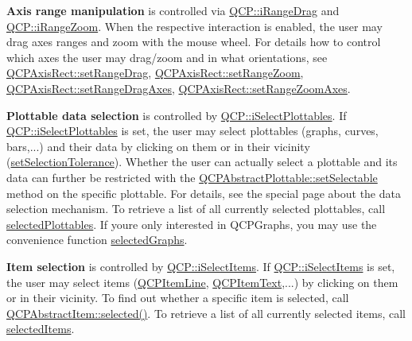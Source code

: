 {\bfseries{Axis range manipulation}} is controlled via \mbox{\hyperlink{namespace_q_c_p_a2ad6bb6281c7c2d593d4277b44c2b037a2c4432b9aceafb94000be8d1b589ef18}{Q\+C\+P\+::i\+Range\+Drag}} and \mbox{\hyperlink{namespace_q_c_p_a2ad6bb6281c7c2d593d4277b44c2b037abee1e94353525a636aeaf0ba32b72e14}{Q\+C\+P\+::i\+Range\+Zoom}}. When the respective interaction is enabled, the user may drag axes ranges and zoom with the mouse wheel. For details how to control which axes the user may drag/zoom and in what orientations, see \mbox{\hyperlink{class_q_c_p_axis_rect_ae6aef2f7211ba6097c925dcd26008418}{Q\+C\+P\+Axis\+Rect\+::set\+Range\+Drag}}, \mbox{\hyperlink{class_q_c_p_axis_rect_a7960a9d222f1c31d558b064b60f86a31}{Q\+C\+P\+Axis\+Rect\+::set\+Range\+Zoom}}, \mbox{\hyperlink{class_q_c_p_axis_rect_a648cce336bd99daac4a5ca3e5743775d}{Q\+C\+P\+Axis\+Rect\+::set\+Range\+Drag\+Axes}}, \mbox{\hyperlink{class_q_c_p_axis_rect_a9442cca2aa358405f39a64d51eca13d2}{Q\+C\+P\+Axis\+Rect\+::set\+Range\+Zoom\+Axes}}.

{\bfseries{Plottable data selection}} is controlled by \mbox{\hyperlink{namespace_q_c_p_a2ad6bb6281c7c2d593d4277b44c2b037a67148c8227b4155eca49135fc274c7ec}{Q\+C\+P\+::i\+Select\+Plottables}}. If \mbox{\hyperlink{namespace_q_c_p_a2ad6bb6281c7c2d593d4277b44c2b037a67148c8227b4155eca49135fc274c7ec}{Q\+C\+P\+::i\+Select\+Plottables}} is set, the user may select plottables (graphs, curves, bars,...) and their data by clicking on them or in their vicinity (\mbox{\hyperlink{class_q_custom_plot_a4dc31241d7b09680950e19e5f971ed93}{set\+Selection\+Tolerance}}). Whether the user can actually select a plottable and its data can further be restricted with the \mbox{\hyperlink{class_q_c_p_abstract_plottable_ac238d6e910f976f1f30d41c2bca44ac3}{Q\+C\+P\+Abstract\+Plottable\+::set\+Selectable}} method on the specific plottable. For details, see the special page about the data selection mechanism. To retrieve a list of all currently selected plottables, call \mbox{\hyperlink{class_q_custom_plot_a747faaab57c56891e901a1e97fa4359a}{selected\+Plottables}}. If you\textquotesingle{}re only interested in Q\+C\+P\+Graphs, you may use the convenience function \mbox{\hyperlink{class_q_custom_plot_ad3547aded026d8a9ae6ef13a69080d06}{selected\+Graphs}}.

{\bfseries{Item selection}} is controlled by \mbox{\hyperlink{namespace_q_c_p_a2ad6bb6281c7c2d593d4277b44c2b037aea2f7c105d674e76d9b187b02ef29260}{Q\+C\+P\+::i\+Select\+Items}}. If \mbox{\hyperlink{namespace_q_c_p_a2ad6bb6281c7c2d593d4277b44c2b037aea2f7c105d674e76d9b187b02ef29260}{Q\+C\+P\+::i\+Select\+Items}} is set, the user may select items (\mbox{\hyperlink{class_q_c_p_item_line}{Q\+C\+P\+Item\+Line}}, \mbox{\hyperlink{class_q_c_p_item_text}{Q\+C\+P\+Item\+Text}},...) by clicking on them or in their vicinity. To find out whether a specific item is selected, call \mbox{\hyperlink{class_q_c_p_abstract_item_aa069fba320a13639f119f82ad29ead96}{Q\+C\+P\+Abstract\+Item\+::selected()}}. To retrieve a list of all currently selected items, call \mbox{\hyperlink{class_q_custom_plot_afda487bcf2d6cf1a57173d82495e29ba}{selected\+Items}}.

